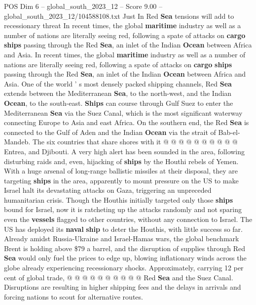 \begin{textsample}{POS Dim 6 – global\_south\_2023\_12 – Score 9.00 – global\_south\_2023\_12/104588108.txt}  \label{ex:f6_pos_108}
Just In Red \textbf{Sea} tensions will add to recessionary threat In recent times, the global \textbf{maritime} industry as well as a number of nations are literally seeing red, following a spate of attacks on \textbf{cargo} \textbf{ships} passing through the Red \textbf{Sea}, an inlet of the Indian \textbf{Ocean} between Africa and Asia.
In recent times, the global \textbf{maritime} industry as well as a number of nations are literally seeing red, following a spate of attacks on \textbf{cargo} \textbf{ships} passing through the Red \textbf{Sea}, an inlet of the Indian \textbf{Ocean} between Africa and Asia.
One of the world ' s most densely packed shipping channels, Red \textbf{Sea} extends between the Mediterranean \textbf{Sea}, to the north-west, and the Indian \textbf{Ocean}, to the south-east. \textbf{Ships} can course through Gulf Suez to enter the Mediterranean \textbf{Sea} via the Suez Canal, which is the most significant waterway connecting Europe to Asia and east Africa.
On the southern end, the Red \textbf{Sea} is connected to the Gulf of Aden and the Indian \textbf{Ocean} via the strait of Bab-el-Mandeb.
The six countries that share shores with it @ @ @ @ @ @ @ @ @ @ Entrea, and Djibouti.
A very high alert has been sounded in the area, following disturbing raids and, even, hijacking of \textbf{ships} by the Houthi rebels of Yemen.
With a huge arsenal of long-range ballistic missiles at their disposal, they are targeting \textbf{ships} in the area, apparently to mount pressure on the US to make Israel halt its devastating attacks on Gaza, triggering an unpreceded humanitarian crisis.
Though the Houthis initially targeted only those \textbf{ships} bound for Israel, now it is ratcheting up the attacks randomly and not sparing even the \textbf{vessels} flagged to other countries, without any connection to Israel.
The US has deployed its \textbf{naval} \textbf{ship} to deter the Houthis, with little success so far.
Already amidst Russia-Ukraine and Israel-Hamas wars, the global benchmark Brent is holding above \$79 a barrel, and the disruption of supplies through Red \textbf{Sea} would only fuel the prices to edge up, blowing inflationary winds across the globe already experiencing recessionary shocks.
Approximately, carrying 12 per cent of global trade, @ @ @ @ @ @ @ @ @ @ Red \textbf{Sea} and the Suez Canal.
Disruptions are resulting in higher shipping fees and the delays in arrivals and forcing nations to scout for alternative routes.

\end{textsample}
